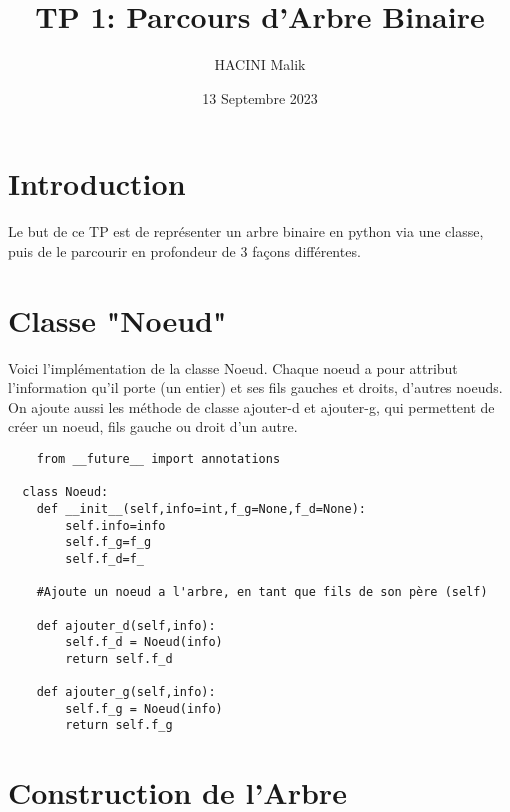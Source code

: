 \documentclass{article}
\title{TP 1: Parcours d'Arbre Binaire}
\author{HACINI Malik}
\date{13 Septembre 2023}
\begin{document}
\maketitle
\tableofcontents{}

\section{Introduction}

Le but de ce TP est de représenter un arbre binaire en python via une classe,
puis de le parcourir en profondeur de 3 façons différentes.




\section{Classe "Noeud"}
Voici l'implémentation de la classe Noeud.
Chaque noeud a pour attribut l'information qu'il porte (un entier) 
et ses fils gauches et droits, d'autres noeuds.
On ajoute aussi les méthode de classe ajouter-d et ajouter-g, qui
permettent de créer un noeud, fils gauche ou droit d'un autre.

\renewcommand{\theFancyVerbLine}{
  \sffamily\textcolor[rgb]{0.5,0.5,0.5}{\scriptsize\arabic{FancyVerbLine}}}

\begin{verbatim}
    from __future__ import annotations

  class Noeud:
    def __init__(self,info=int,f_g=None,f_d=None):
        self.info=info
        self.f_g=f_g
        self.f_d=f_
        
    #Ajoute un noeud a l'arbre, en tant que fils de son père (self)

    def ajouter_d(self,info):
        self.f_d = Noeud(info)
        return self.f_d
    
    def ajouter_g(self,info):
        self.f_g = Noeud(info)
        return self.f_g

\end{verbatim}

\section{Construction de l'Arbre}
\end{document}
